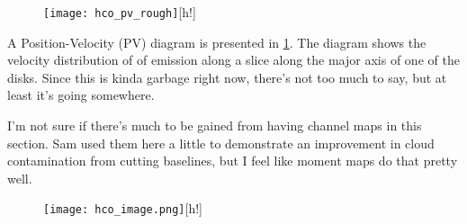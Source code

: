 \begin{figure}
\centering
\texttt{[image: hco\_pv\_rough]}[h!]
  \label{fig:pv_diag}
\end{figure}

A Position-Velocity (PV) diagram is presented in \ref{fig:pv_diag}. The diagram shows the velocity distribution of of emission along a slice along the major axis of one of the disks. Since this is kinda garbage right now, there's not too much to say, but at least it's going somewhere.





I'm not sure if there's much to be gained from having channel maps in this section. Sam used them here a little to demonstrate an improvement in cloud contamination from cutting baselines, but I feel like moment maps do that pretty well.

\begin{figure}
\centering
\texttt{[image: hco\_image.png]}[h!]
  \label{fig:CO_m0}
\end{figure}











\iffalse
Things to get:
* Rewrite this whole thing.
* Integrated Flux Measurements
* Find max width of disks for each line by 3-sigma contour

* use uvfit for elliptical guassian vis fits.

\fi

\iffalse
\begin{figure}
\centering
\begin{minipage}{.5\textwidth}
  \centering
  \texttt{[image: m0-map\_co-co.pdf]}
  \captionof{figure}{First moment map of HCO+, with and without (below and above, respectively) baseline cuts.}
  \label{fig:test1}
\end{minipage}%
\begin{minipage}{.5\textwidth}
  \centering
  \texttt{[image: m1-map\_co-co.pdf]}
  \captionof{figure}{First moment map of HCN, with and without (below and above, respectively) baseline cuts.}
  \label{fig:test2}
\end{minipage}
\end{figure}
\fi



